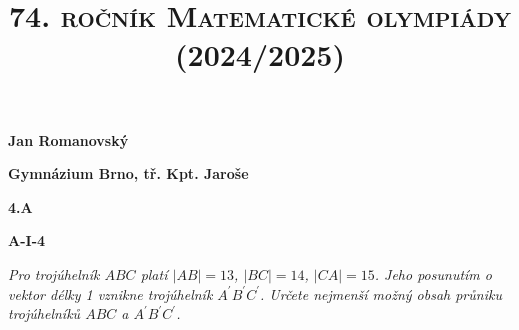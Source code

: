 \documentclass{article}
\title{\normalsize{\vspace{-2cm}\textsc{74. ročník Matematické olympiády (2024/2025)}\vspace{-1.7cm}}}
\date{}
\author{}
\begin{document}
\maketitle

\textbf{ }

\noindent \textbf{Jan Romanovský}

\noindent \textbf{Gymnázium Brno, tř. Kpt. Jaroše}

\noindent \textbf{4.A}

\noindent \textbf{A-\textrm{I}-4}

\textbf{ }

\textit{Pro trojúhelník $ABC$ platí $|AB| = 13$, $|BC| = 14$, $|CA| = 15$. Jeho posunutím o vektor délky 1 vznikne trojúhelník $A^\prime B^\prime C^\prime$. Určete nejmenší možný obsah průniku trojúhelníků $ABC$ a $A^\prime B^\prime C^\prime$.}
\end{document}
